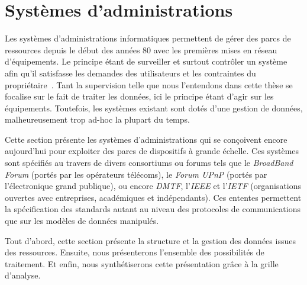 \section{Systèmes d'administrations}\label{sec:rw:supervision:administration}
Les systèmes d'administrations informatiques permettent de gérer des parcs de ressources depuis le début des années 80 avec les premières mises en réseau d'équipements. Le principe étant de surveiller et surtout contrôler un système afin qu'il satisfasse les demandes des utilisateurs et les contraintes du propriétaire~\cite{Sloman:management}. Tant la supervision telle que nous l'entendons dans cette thèse se focalise sur le fait de traiter les données, ici le principe étant d'agir sur les équipements. Toutefois, les systèmes existant sont dotés d'une gestion de données, malheureusement trop ad-hoc la plupart du temps.

Cette section présente les systèmes d'administrations qui se conçoivent encore aujourd'hui pour exploiter des parcs de dispositifs à grande échelle. Ces systèmes sont spécifiés au travers de divers consortiums ou forums tels que le \textit{BroadBand Forum} (portés par les opérateurs télécoms), le \textit{Forum UPnP} (portés par l'électronique grand publique), ou encore \textit{DMTF}, l'\textit{IEEE} et l'\textit{IETF} (organisations ouvertes avec entreprises, académiques et indépendants). Ces ententes permettent la spécification des standards autant au niveau des protocoles de communications que sur les modèles de données manipulés.

Tout d'abord, cette section présente la structure et la gestion des données issues des ressources. Ensuite, nous présenterons l'ensemble des possibilités de traitement. Et enfin, nous synthétiserons cette présentation grâce à la grille d'analyse.
